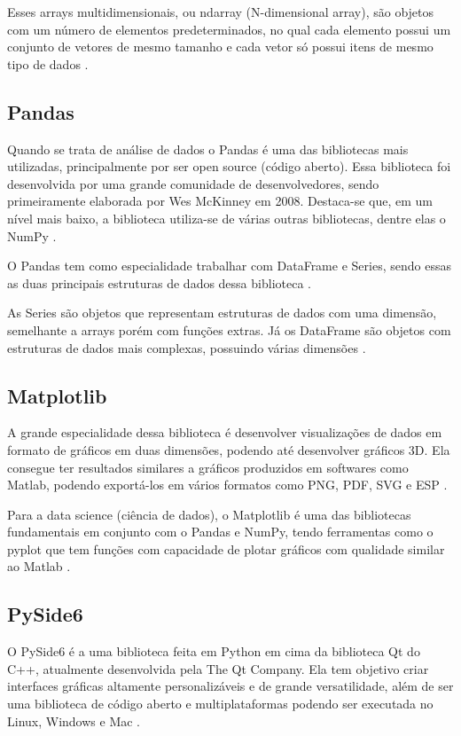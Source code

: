 Esses arrays multidimensionais, ou ndarray (N-dimensional array), são objetos com um número de elementos predeterminados, no qual cada elemento possui um conjunto de vetores de mesmo tamanho e cada vetor só possui itens de mesmo tipo de dados \cite{ref:nelli_2023}.

\subsection{Pandas}

Quando se trata de análise de dados o Pandas é uma das bibliotecas mais utilizadas, principalmente por ser open source (código aberto). Essa biblioteca foi desenvolvida por uma grande comunidade de desenvolvedores, sendo primeiramente elaborada por Wes McKinney em 2008.  Destaca-se que, em um nível mais baixo, a biblioteca utiliza-se de várias outras bibliotecas, dentre elas o NumPy \cite{ref:mckinney_2022}.

O Pandas tem como especialidade trabalhar com DataFrame e Series, sendo essas as duas principais estruturas de dados dessa biblioteca \cite{ref:nelli_2023}.

As Series são objetos que representam estruturas de dados com uma dimensão, semelhante a arrays porém com funções extras. Já os DataFrame são objetos com estruturas de dados mais complexas, possuindo várias dimensões \cite{ref:nelli_2023}.

\subsection{Matplotlib}

A grande especialidade dessa biblioteca é desenvolver visualizações de dados em formato de gráficos em duas dimensões, podendo até desenvolver gráficos 3D. Ela consegue ter resultados similares a gráficos produzidos em softwares como Matlab, podendo exportá-los em vários formatos como PNG, PDF, SVG e ESP \cite{ref:nelli_2023}.

Para a data science (ciência de dados), o Matplotlib é uma das bibliotecas fundamentais em conjunto com o Pandas e NumPy, tendo ferramentas como o pyplot que tem funções com capacidade de plotar gráficos com qualidade similar ao Matlab \cite{ref:bisong_2019}.

\subsection{PySide6}

O PySide6 é a uma biblioteca feita em Python em cima da biblioteca Qt do C++, atualmente desenvolvida pela The Qt Company. Ela tem objetivo criar interfaces gráficas altamente personalizáveis e de grande versatilidade, além de ser uma biblioteca de código aberto e multiplataformas podendo ser executada no Linux, Windows e Mac \cite{ref:fitzpatrick_2022}.
